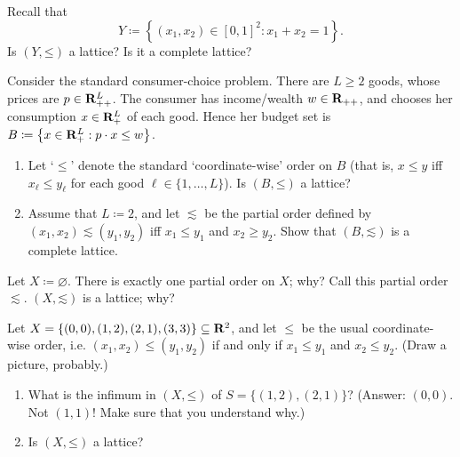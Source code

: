 \begin{namedthm}
	\label{exercise:lb-R2_lat_e-g}
	Recall that
	\begin{equation*}
		Y \coloneqq \left\{ (x_1,x_2) \in [0,1]^2 : x_1 + x_2 = 1 \right\} .
	\end{equation*}
	Is $( Y, \mathord{\leq} )$ a lattice? Is it a complete lattice?
\end{namedthm}

\begin{exercise}
	\label{exercise:budget_set_latt}
	Consider the standard consumer-choice problem. There are $L \geq 2$ goods, whose prices are $p \in \mathbf{R}_{++}^L$. The consumer has income/wealth $w \in \mathbf{R}_{++}$, and chooses her consumption $x \in \mathbf{R}_+^L$ of each good. Hence her budget set is $B \coloneqq \left\{ x \in \R_+^L : p \cdot x \leq w \right\}$.

	\begin{enumerate}[label=(\alph*)]
	
		\item Let `$\leq$' denote the standard `coordinate-wise' order on $B$ (that is, $x \leq y$ iff $x_\ell \leq y_\ell$ for each good $\ell \in \{1,\dots,L\}$). Is $(B,\mathord{\leq})$ a lattice?

		\item Assume that $L \coloneq 2$, and let $\lesssim$ be the partial order defined by $(x_1,x_2) \lesssim (y_1,y_2)$ iff $x_1 \leq y_1$ and $x_2 \geq y_2$. Show that $(B,\mathord{\lesssim})$ is a complete lattice.
	
	\end{enumerate}
	
\end{exercise}

\begin{namedthm}
	\label{exercise:lb_empty_lat}
	Let $X \coloneqq \varnothing$. There is exactly one partial order on $X$; why? Call this partial order $\lesssim$. $(X,\mathord{\lesssim})$ is a lattice; why?
\end{namedthm}

\begin{exercise}
	\label{exercise:diamond}
	Let $X = \left\{ (0,0), (1,2), (2,1), (3,3) \right\} \subseteq \R^2$, and let $\leq$ be the usual coordinate-wise order, i.e. $(x_1,x_2) \leq (y_1,y_2)$ if and only if $x_1 \leq y_1$ and $x_2 \leq y_2$. (Draw a picture, probably.)
	
	\begin{enumerate}[label=(\alph*)]
	
		\item What is the infimum in $(X,\mathord{\leq})$ of $S = \{ (1,2), (2,1) \}$? (Answer: $(0,0)$. Not $(1,1)$! Make sure that you understand why.)

		\item Is $(X,\mathord{\leq})$ a lattice?
	
	\end{enumerate}
\end{exercise}

